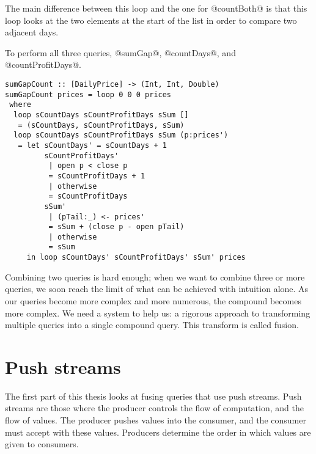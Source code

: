 The main difference between this loop and the one for @countBoth@ is that this loop looks at the two elements at the start of the list in order to compare two adjacent days.

To perform all three queries, @sumGap@, @countDays@, and @countProfitDays@.

\begin{lstlisting}
sumGapCount :: [DailyPrice] -> (Int, Int, Double)
sumGapCount prices = loop 0 0 0 prices
 where
  loop sCountDays sCountProfitDays sSum []
   = (sCountDays, sCountProfitDays, sSum)
  loop sCountDays sCountProfitDays sSum (p:prices')
   = let sCountDays' = sCountDays + 1
         sCountProfitDays'
          | open p < close p
          = sCountProfitDays + 1
          | otherwise
          = sCountProfitDays
         sSum'
          | (pTail:_) <- prices'
          = sSum + (close p - open pTail)
          | otherwise
          = sSum
     in loop sCountDays' sCountProfitDays' sSum' prices
\end{lstlisting}



% 


Combining two queries is hard enough; when we want to combine three or more queries, we soon reach the limit of what can be achieved with intuition alone.
As our queries become more complex and more numerous, the compound becomes more complex.
We need a system to help us: a rigorous approach to transforming multiple queries into a single compound query.
This transform is called fusion.

\section{Push streams}

The first part of this thesis looks at fusing queries that use push streams.
Push streams are those where the producer controls the flow of computation, and the flow of values.
The producer pushes values into the consumer, and the consumer must accept with these values.
Producers determine the order in which values are given to consumers.


